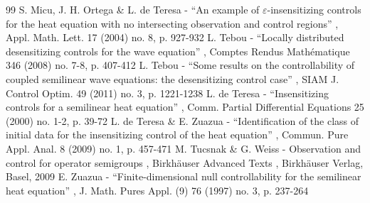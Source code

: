 \documentclass[10pt,a4paper]{amsart}
\theoremstyle{definition}
\begin{document}
\begin{thebibliography}{99}
 S. Micu, J. H. Ortega \& L. de Teresa - “An example of $\varepsilon $-insensitizing controls for the heat equation with no intersecting observation and control regions” , Appl. Math. Lett. 17 (2004) no. 8, p. 927-932
 L. Tebou - “Locally distributed desensitizing controls for the wave equation” , Comptes Rendus Mathématique 346 (2008) no. 7-8, p. 407-412
 L. Tebou - “Some results on the controllability of coupled semilinear wave equations: the desensitizing control case” , SIAM J. Control Optim. 49 (2011) no. 3, p. 1221-1238
 L. de Teresa - “Insensitizing controls for a semilinear heat equation” , Comm. Partial Differential Equations 25 (2000) no. 1-2, p. 39-72
 L. de Teresa \& E. Zuazua - “Identification of the class of initial data for the insensitizing control of the heat equation” , Commun. Pure Appl. Anal. 8 (2009) no. 1, p. 457-471
 M. Tucsnak \& G. Weiss - Observation and control for operator semigroups , Birkhäuser Advanced Texts , Birkhäuser Verlag, Basel, 2009
 E. Zuazua - “Finite-dimensional null controllability for the semilinear heat equation” , J. Math. Pures Appl. (9) 76 (1997) no. 3, p. 237-264
\end{thebibliography}
\end{document}
